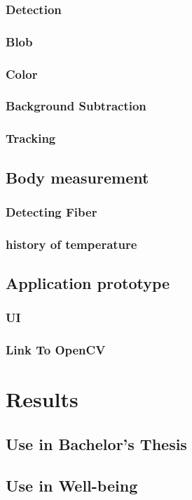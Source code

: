 \documentclass[hidelinks,11pt,a4paper,oneside,article]{memoir}
\begin{document}
    \subsection{Detection}
    \subsection{Blob}
    \subsection{Color}
    \subsection{Background Subtraction}
    \subsection{Tracking}
    \section{Body measurement}
    \subsection{Detecting Fiber}
    \subsection{history of temperature}
    \section{Application prototype}
    \subsection{UI}
    \subsection{Link To OpenCV}
    
    \clearpage
	\chapter{Results}
    \section{Use in Bachelor's Thesis}
    \section{Use in Well-being}
	
\end{document}
